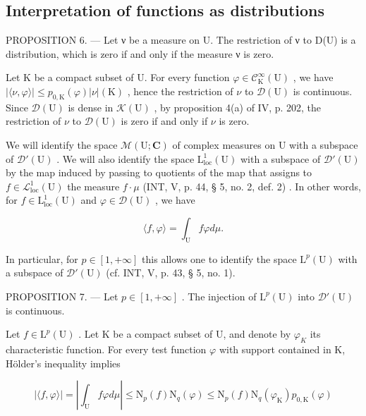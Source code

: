 \subsection{Interpretation of functions as distributions}

PROPOSITION 6. --- Let ν be a measure on U. The restriction of ν to D(U) is a distribution, which is zero if and only if the measure ν is zero.

Let K be a compact subset of U. For every function \(\varphi\in\mathcal{C}_{\mathrm{K}}^{\infty}(\mathrm{U})\) , we have \(|\langle\nu,\varphi\rangle|\leqslant p_{0,\mathrm{K}}(\varphi)|\nu|(\mathrm{K})\) , hence the restriction of \(\nu\) to \(\mathcal{D}(\mathrm{U})\) is continuous. Since \(\mathcal{D}(\mathrm{U})\) is dense in \(\mathcal{K}(\mathrm{U})\) , by proposition 4(a) of IV, p. 202, the restriction of \(\nu\) to \(\mathcal{D}(\mathrm{U})\) is zero if and only if \(\nu\) is zero.

We will identify the space \(\mathcal{M}(\mathrm{U};\mathbf{C})\) of complex measures on U with a subspace of \(\mathcal{D}'(\mathrm{U})\) . We will also identify the space \(\mathrm{L}_{\mathrm{loc}}^{1}(\mathrm{U})\) with a subspace of \(\mathcal{D}'(\mathrm{U})\) by the map induced by passing to quotients of the map that assigns to \(f\in \mathcal{L}_{\mathrm{loc}}^{1}(\mathrm{U})\) the measure \(f\cdot \mu\) (INT, V, p. 44, § 5, no. 2, def. 2) . In other words, for \(f\in \mathrm{L}_{\mathrm{loc}}^{1}(\mathrm{U})\) and \(\varphi \in \mathcal{D}(\mathrm{U})\) , we have

\[
\langle f, \varphi \rangle = \int_ {\mathrm{U}} f \varphi d \mu .
\]

In particular, for \(p \in [1, +\infty]\) this allows one to identify the space \(\mathrm{L}^p(\mathrm{U})\) with a subspace of \(\mathcal{D}'(\mathrm{U})\) (cf. INT, V, p. 43, § 5, no. 1).

PROPOSITION 7. --- Let \(p \in [1, +\infty]\) . The injection of \(\mathrm{L}^p(\mathrm{U})\) into \(\mathcal{D}'(\mathrm{U})\) is continuous.

Let \(f \in \mathrm{L}^{p}(\mathrm{U})\) . Let K be a compact subset of U, and denote by \(\varphi_{K}\) its characteristic function. For every test function \(\varphi\) with support contained in K, Hölder's inequality implies

\[
| \langle f, \varphi \rangle | = \left| \int_ {\mathrm{U}} f \varphi d \mu \right| \leqslant \mathrm{N} _ {p} (f) \mathrm{N} _ {q} (\varphi) \leqslant \mathrm{N} _ {p} (f) \mathrm{N} _ {q} (\varphi_ {\mathrm{K}}) p _ {0, \mathrm{K}} (\varphi)
\]


